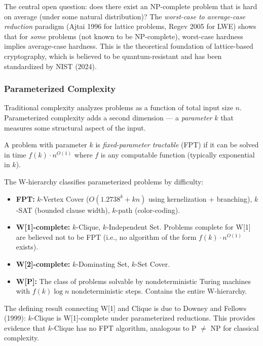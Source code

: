 The central open question: does there exist an NP-complete problem that is hard on average (under some natural distribution)? The \emph{worst-case to average-case reduction} paradigm (Ajtai 1996 for lattice problems, Regev 2005 for LWE) shows that for \emph{some} problems (not known to be NP-complete), worst-case hardness implies average-case hardness. This is the theoretical foundation of lattice-based cryptography, which is believed to be quantum-resistant and has been standardized by NIST (2024).

\subsubsection*{Parameterized Complexity}
\label{sec:np:parameterized}

Traditional complexity analyzes problems as a function of total input size $n$. Parameterized complexity adds a second dimension — a \emph{parameter} $k$ that measures some structural aspect of the input.

\begin{definition}
A problem with parameter $k$ is \emph{fixed-parameter tractable} (FPT) if it can be solved in time $f(k) \cdot n^{O(1)}$ where $f$ is any computable function (typically exponential in $k$).
\end{definition}

The W-hierarchy classifies parameterized problems by difficulty:
\begin{itemize}
\item \textbf{FPT:} $k$-Vertex Cover ($O(1.2738^k + kn)$ using kernelization + branching), $k$-SAT (bounded clause width), $k$-path (color-coding).
\item \textbf{W[1]-complete:} $k$-Clique, $k$-Independent Set. Problems complete for W[1] are believed not to be FPT (i.e., no algorithm of the form $f(k) \cdot n^{O(1)}$ exists).
\item \textbf{W[2]-complete:} $k$-Dominating Set, $k$-Set Cover.
\item \textbf{W[P]:} The class of problems solvable by nondeterministic Turing machines with $f(k) \log n$ nondeterministic steps. Contains the entire W-hierarchy.
\end{itemize}

The defining result connecting W[1] and Clique is due to Downey and Fellows (1999): $k$-Clique is W[1]-complete under parameterized reductions. This provides evidence that $k$-Clique has no FPT algorithm, analogous to P $\neq$ NP for classical complexity.


